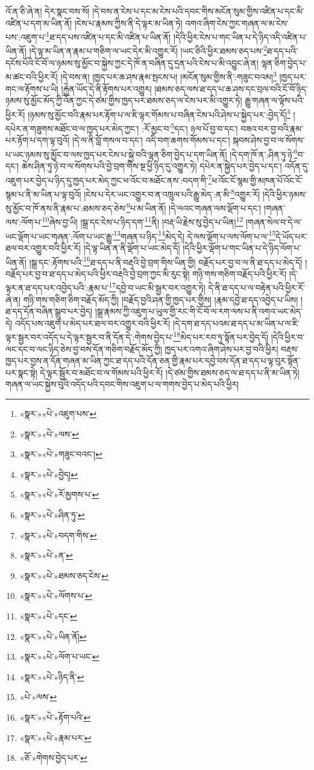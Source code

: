 འོ་ན་ཅི་ཞེ་ན། དེར་སྣང་བས་སོ། །དེ་བས་ན་ངེས་པ་དང་མ་ངེས་པའི་དབང་གིས་མངོན་སུམ་གྱིས་འཛིན་པ་དང་མི་འཛིན་པ་དག་མ་ཡིན་ནོ། །ངེས་པ་རྣམས་ཀྱིས་ནི་དེ་ལྟར་མ་ཡིན་ཏེ། འགའ་ཞིག་ངེས་ཀྱང་གཞན་ལ་མ་ངེས་པས་:འཇུག་པ་\footnote{«སྣར་»«པེ་»འཇུག་པས་}ཐ་དད་པས་འཛིན་པ་དང་མི་འཛིན་པ་ཡིན་ནོ། །དེའི་ཕྱིར་ངེས་པ་གང་ཡིན་པ་དེ་ཉིད་འདི་འཛིན་པ་ཡིན་ནོ། །དེ་ལྟ་མ་ཡིན་ན་རྣམ་པ་གཅིག་ལ་ཡང་དེར་མི་འགྱུར་རོ། །ཡང་ཅིའི་ཕྱིར་ཐམས་ཅད་པས་\footnote{«སྣར་»«པེ་»ལས་}ཐ་དད་པའི་དངོས་པོའི་ངོ་བོ་ལ་ཉམས་སུ་མྱོང་བ་སྐྱེས་ཀྱང་དེ་ཁོ་ན་བཞིན་དུ་དྲན་པའི་ངེས་པ་མི་འབྱུང་ཞེ་ན། ལྷན་ཅིག་བྱེད་པ་མ་ཚང་བའི་ཕྱིར་རོ། །དེ་བས་ན། །ཁྱད་པར་ཆ་ཤས་རྣམ་སྤངས་པ། །མངོན་སུམ་གྱིས་ནི་:གཟུང་བའམ།\footnote{«སྣར་»«པེ་»གཟུང་བའང་།} །ཁྱད་པར་གང་ལ་རྟོགས་པ་ཡི། །རྐྱེན་ཡོད་དེ་ནི་རྟོགས་པར་འགྱུར། །ཐམས་ཅད་ལས་ཐ་དད་པ་ཆ་ཤས་དང་བྲལ་བའི་ངོ་བོ་ཉིད་ཉམས་སུ་མྱོང་མོད་ཀྱི་འོན་ཀྱང་དེ་ཙམ་གྱིས་ཁྱད་པར་ཐམས་ཅད་ལ་ངེས་པར་མི་འགྱུར་ཏེ། རྒྱུ་གཞན་ལ་ལྟོས་པའི་ཕྱིར་རོ། །ཉམས་སུ་མྱོང་བའི་རྣམ་པར་རྟོག་པ་ལ་ཇི་ལྟར་གོམས་པ་བཞིན་ངེས་པའི་ཤེས་པ་སྐྱེད་པར་:བྱེད་དོ།\footnote{«སྣར་»«པེ་»བྱེད།} །དཔེར་ན་གཟུགས་མཐོང་བ་ལ་ཁྱད་པར་མེད་ཀྱང་། :རོ་མྱང་བ་\footnote{«སྣར་»«པེ་»རོ་མྱགས་པ་}དང་། ཉལ་པོ་བྱ་བ་དང་། བཟའ་བར་བྱ་བའི་རྣམ་པར་རྟོག་པ་དག་ལྟ་བུའོ། །དེ་ལ་ནི་བློ་གསལ་བ་དང་། འདི་བག་ཆགས་གོམས་པ་དང་། སྐབས་ཤེས་བྱ་བ་ལ་སོགས་པ་ཡང་ཉམས་སུ་མྱོང་བ་ལས་ཁྱད་པར་ངེས་པ་སྐྱེ་བའི་ལྷན་ཅིག་བྱེད་པ་དག་ཡིན་ནོ། །དེ་དག་ཁོ་ན་:ཤིན་ཏུ་ཉེ་\footnote{«སྣར་»«པེ་»ཤིན་ཏུ་}བ་དང་། ཆེས་ཤིན་ཏུ་ཉེ་བ་ལ་སོགས་པའི་བྱེ་བྲག་གིས་སྔ་ཕྱི་ཉིད་དུ་འགྱུར་ཏེ། དཔེར་ན་སྐྱེད་པར་བྱེད་པ་དང་། འདོན་དུ་འཇུག་པར་བྱེད་པ་ཉིད་དུ་ཁྱད་པར་མེད་ཀྱང་ཕ་འོང་བ་མཐོང་ནས་:བདག་གི་\footnote{«སྣར་»«པེ་»བདག་གིས་}ཕ་འོང་ངོ་སྙམ་གྱི་མཁན་པོ་འོང་ངོ་སྙམ་པ་ནི་མ་ཡིན་པ་ལྟ་བུའོ། །ངེས་པ་དེར་ཡང་འགྱུར་བ་ན་འཁྲུལ་པའི་རྒྱུ་མེད་:ན་མི་\footnote{«སྣར་»«པེ་»ན་}འགྱུར་རོ། །དེའི་ཕྱིར་ཉམས་སུ་མྱོང་བ་ཁོ་ནས་ནི་རྣམ་པ་:ཐམས་ཅད་ཅེས་\footnote{«སྣར་»«པེ་»ཐམས་ཅད་ངེས་}པ་མ་ཡིན་ནོ། །དེ་ལའང་གཞན་ལས་ལྡོག་པ་དང་། །གཞན་ལས་:ལོག་པ་\footnote{«སྣར་»«པེ་»ལོགས་པ་}ཞེས་བྱ་ཡི། །སྒྲ་དང་ངེས་པ་ཉིད་དག་\footnote{«སྣར་»«པེ་»དང་}ནི། །བརྡ་ཡི་རྗེས་སུ་བྱེད་པ་ཡིན།\footnote{«སྣར་»«པེ་»ཡིན་ནོ།} །གཞན་སེལ་བ་དེ་ལ་ཡང་ལྡོག་པ་ཡང་གཞན་:ལོག་པ་ཡང་རྒྱུ་\footnote{«སྣར་»«པེ་»ལོག་པ་ཡང་}གཞན་པ་ཉིད་\footnote{«སྣར་»«པེ་»ཉིད་ནི་}མེད་དེ། དེ་ལས་ལྡོག་པ་ལས་ལོག་པ་ལ་\footnote{«པེ་»ལས་}དེ་ཡོད་པར་ཐལ་བར་འགྱུར་བའི་ཕྱིར་རོ། །དེ་ལྟ་ཡིན་ན་ནི་ལྡོག་པ་ཡང་མེད་དོ། །དེའི་ཕྱིར་ལྡོག་པ་གང་ཡིན་པ་དེ་ཉིད་ལོག་པ་ཡིན་ནོ། །སྒྲ་དང་:རྟོགས་པའི་\footnote{«སྣར་»«པེ་»རྟོག་པའི་}ཐ་དད་པ་ནི་བརྡའི་བྱེ་བྲག་གིས་ཡིན་གྱི། བརྗོད་པར་བྱ་བ་ལ་ནི་ཐ་དད་པ་མེད་དོ། །བརྗོད་པར་བྱ་བ་ཐ་དད་པ་མེད་པའི་ཕྱིར་བརྡའི་བྱེ་བྲག་ཀྱང་མི་རུང་སྟེ། གཉི་གས་གཅིག་བརྗོད་པའི་ཕྱིར་རོ། །དེ་ལྟར་ན་ཐ་དད་པར་འབྱེད་པའི་:རྣམ་པ་\footnote{«སྣར་»«པེ་»རྣམ་པར་}དབྱེ་བ་ཡང་མི་སྦྱར་བར་འགྱུར་ཏེ། དེ་ནི་ཐ་དད་པ་ལ་བརྟེན་པའི་ཕྱིར་རོ་ཞེ་ན། གཉི་གས་གཅིག་ཅིག་བརྗོད་མོད་ཀྱི། །བརྗོད་བྱའི་ཤན་གྱི་ཁྱད་པར་གྱིས། །རྣམ་དབྱེ་ཐ་དད་འབྱེད་པ་ཡིས། །ཐ་དད་དོན་བཞིན་སྒྲུབ་པར་བྱེད། །སྒྲ་རྣམས་ཀྱི་འཇུག་པ་ཡུལ་གྱི་རང་གི་ངོ་བོ་ལ་རག་ལས་པ་ནི་འགའ་ཡང་མེད་དེ། འདོད་པས་འཇུག་པ་མེད་པར་ཐལ་བར་འགྱུར་བའི་ཕྱིར་རོ། །དེ་དག་ཐ་དད་པའམ་ཐ་དད་པ་མ་ཡིན་པ་ལ་ཇི་ལྟར་སྦྱར་བར་འདོད་པ་དེ་ལྟར་སྦྱར་བ་ནི་དོན་དེ་:གེགས་བྱེད་པ་\footnote{«ཅོ་»གེགས་བྱེད་པར་}མེད་པར་རབ་ཏུ་སྟོན་པར་བྱེད་དོ། །དེའི་ཕྱིར་བ་ལང་དང་བ་ལང་ཉིད་ཅེས་བྱ་བས་དོན་གཅིག་བརྗོད་མོད་ཀྱི། ཁྱད་པར་འགའ་ཞིག་ཤེས་པར་བྱ་བའི་ཕྱིར། བརྡས་ཁྱད་པར་བྱས་ན་དོན་གཞན་མ་ཡིན་ཀྱང་ཐ་དད་པའི་དོན་ཅན་གྱི་རྣམ་པར་དབྱེ་བས་དོན་ཐ་དད་པ་ལྟ་བུར་སྟོན་པར་སྣང་སྟེ། དེ་ལྟར་སྦྱོར་བ་མཐོང་བ་ལ་གོམས་པའི་ཕྱིར་རོ། །དེ་ཙམ་གྱིས་ཐམས་ཅད་ལ་ཐ་དད་པ་ནི་མ་ཡིན་ཏེ། གཞན་ལ་ཡང་སྐྱེས་བུའི་འདོད་པའི་དབང་གིས་འཇུག་པ་ལ་གགས་བྱེད་པ་མེད་པའི་ཕྱིར། 